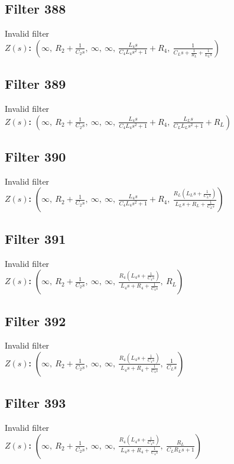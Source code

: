 \documentclass{article}
\begin{document}
\subsection*{Filter 388}
Invalid filter \\ 
\textbf{$Z(s)$:} $\left( \infty, \  R_{2} + \frac{1}{C_{2} s}, \  \infty, \  \infty, \  \frac{L_{4} s}{C_{4} L_{4} s^{2} + 1} + R_{4}, \  \frac{1}{C_{L} s + \frac{1}{R_{L}} + \frac{1}{L_{L} s}}\right)$ \\ 
\subsection*{Filter 389}
Invalid filter \\ 
\textbf{$Z(s)$:} $\left( \infty, \  R_{2} + \frac{1}{C_{2} s}, \  \infty, \  \infty, \  \frac{L_{4} s}{C_{4} L_{4} s^{2} + 1} + R_{4}, \  \frac{L_{L} s}{C_{L} L_{L} s^{2} + 1} + R_{L}\right)$ \\ 
\subsection*{Filter 390}
Invalid filter \\ 
\textbf{$Z(s)$:} $\left( \infty, \  R_{2} + \frac{1}{C_{2} s}, \  \infty, \  \infty, \  \frac{L_{4} s}{C_{4} L_{4} s^{2} + 1} + R_{4}, \  \frac{R_{L} \left(L_{L} s + \frac{1}{C_{L} s}\right)}{L_{L} s + R_{L} + \frac{1}{C_{L} s}}\right)$ \\ 
\subsection*{Filter 391}
Invalid filter \\ 
\textbf{$Z(s)$:} $\left( \infty, \  R_{2} + \frac{1}{C_{2} s}, \  \infty, \  \infty, \  \frac{R_{4} \left(L_{4} s + \frac{1}{C_{4} s}\right)}{L_{4} s + R_{4} + \frac{1}{C_{4} s}}, \  R_{L}\right)$ \\ 
\subsection*{Filter 392}
Invalid filter \\ 
\textbf{$Z(s)$:} $\left( \infty, \  R_{2} + \frac{1}{C_{2} s}, \  \infty, \  \infty, \  \frac{R_{4} \left(L_{4} s + \frac{1}{C_{4} s}\right)}{L_{4} s + R_{4} + \frac{1}{C_{4} s}}, \  \frac{1}{C_{L} s}\right)$ \\ 
\subsection*{Filter 393}
Invalid filter \\ 
\textbf{$Z(s)$:} $\left( \infty, \  R_{2} + \frac{1}{C_{2} s}, \  \infty, \  \infty, \  \frac{R_{4} \left(L_{4} s + \frac{1}{C_{4} s}\right)}{L_{4} s + R_{4} + \frac{1}{C_{4} s}}, \  \frac{R_{L}}{C_{L} R_{L} s + 1}\right)$ \\ 
\end{document}
